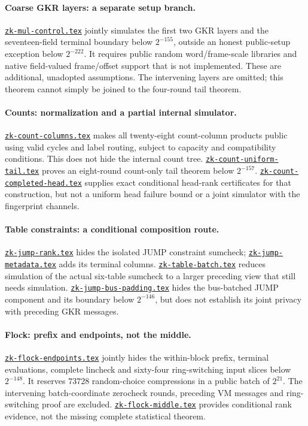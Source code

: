 \documentclass[11pt]{article}
\theoremstyle{definition}
\newcommand{\researchnote}[1]{\href{../#1.tex}{\nolinkurl{#1.tex}}}
\begin{document}
\paragraph{Coarse GKR layers: a separate setup branch.} \researchnote{zk-mul-control} jointly simulates the first two GKR layers and the seventeen-field terminal boundary below $2^{-155}$, outside an honest public-setup exception below $2^{-222}$. It requires public random word/frame-scale libraries and native field-valued frame/offset support that is not implemented. These are additional, unadopted assumptions. The intervening layers are omitted; this theorem cannot simply be joined to the four-round tail theorem.

\paragraph{Counts: normalization and a partial internal simulator.} \researchnote{zk-count-columns} makes all twenty-eight count-column products public using valid cycles and label routing, subject to capacity and compatibility conditions. This does not hide the internal count tree. \researchnote{zk-count-uniform-tail} proves an eight-round count-only tail theorem below $2^{-157}$. \researchnote{zk-count-completed-head} supplies exact conditional head-rank certificates for that construction, but not a uniform head failure bound or a joint simulator with the fingerprint channels.

\paragraph{Table constraints: a conditional composition route.} \researchnote{zk-jump-rank} hides the isolated JUMP constraint sumcheck; \researchnote{zk-jump-metadata} adds its terminal columns. \researchnote{zk-table-batch} reduces simulation of the actual six-table sumcheck to a larger preceding view that still needs simulation. \researchnote{zk-jump-bus-padding} hides the bus-batched JUMP component and its boundary below $2^{-146}$, but does not establish its joint privacy with preceding GKR messages.

\paragraph{Flock: prefix and endpoints, not the middle.} \researchnote{zk-flock-endpoints} jointly hides the within-block prefix, terminal evaluations, complete lincheck and sixty-four ring-switching input slices below $2^{-148}$. It reserves $73728$ random-choice compressions in a public batch of $2^{21}$. The intervening batch-coordinate zerocheck rounds, preceding VM messages and ring-switching proof are excluded. \researchnote{zk-flock-middle} provides conditional rank evidence, not the missing complete statistical theorem.
\end{document}
